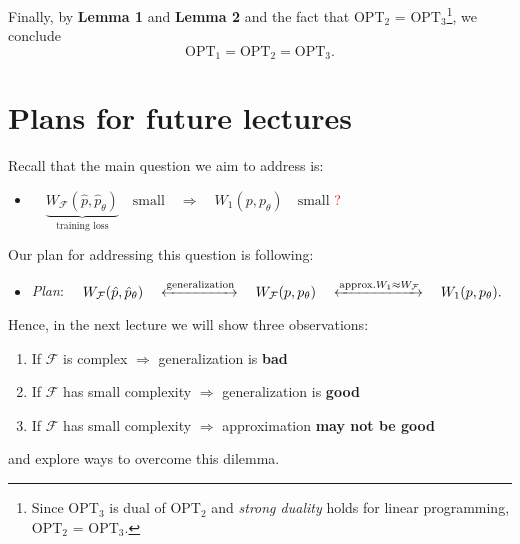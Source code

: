 \documentclass[11pt]{article}
\newcommand{\1}{\mathbb{I}} %
\begin{document}
\noindent Finally, by \textbf{Lemma 1} and \textbf{Lemma 2} and the fact that OPT$_2$ = OPT$_3$\footnote{Since OPT$_3$ is dual of OPT$_2$ and \emph{strong duality} holds for linear programming, OPT$_2$ = OPT$_3$.}, we conclude
$$\text{OPT}_1 = \text{OPT}_2 = \text{OPT}_3.$$

\section{Plans for future lectures}
Recall that the main question we aim to address is:\\
\begin{itemize}
\item[] $\quad
    \underbrace{W_\mathcal{F} (\hat p, \hat p_\theta )}_{\text{training loss}} \quad \text{small} \quad  \Longrightarrow \quad W_1 \left( p, p_\theta \right) \quad \text{small}$ \textcolor{red}{ ? } \\
\end{itemize}
Our plan for addressing this question is following:
\begin{itemize}
\item[] \emph{Plan}: $\quad
W_\mathcal{F} (\hat p, \hat p_\theta ) \quad \xleftrightarrow{\text{generalization}} \quad W_\mathcal{F} (p,p_\theta) \quad \xleftrightarrow{\text{approx.} W_1 \approx W_\mathcal{F}} \quad W_1(p,p_\theta).$\\
\end{itemize}
\noindent Hence, in the next lecture we will show three observations:
\begin{enumerate}
    \item If $\mathcal{F}$ is complex $\Longrightarrow$ generalization is \textbf{bad}
    \item If $\mathcal{F}$ has small complexity $\Longrightarrow$ generalization is \textbf{good}
    \item If $\mathcal{F}$ has small complexity $\Longrightarrow$ approximation \textbf{may not be good}
\end{enumerate}
and explore ways to overcome this dilemma.




\end{document}
